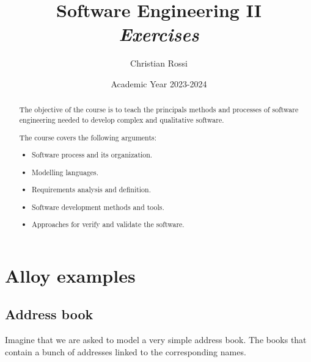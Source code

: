 \documentclass[12pt, a4paper]{report}
\title{Software Engineering II\\ \textit{Exercises}}
\author{Christian Rossi}
\date{Academic Year 2023-2024}
\newtheorem[style=M,bodystyle=\normalfont]{theorem}{Theorem}
\newtheorem[style=M,bodystyle=\normalfont]{corollary}{Corollary}
\newtheorem[style=M,bodystyle=\normalfont]{lemma}{Lemma}
\newtheorem[style=M,bodystyle=\normalfont]{definition}{Definition}
\begin{document}
\maketitle

\newpage

\begin{abstract}
    The objective of the course is to teach the principals methods and processes of software engineering needed to develop complex and qualitative software.
     
    The course covers the following arguments:
    \begin{itemize}
        \item Software process and its organization.
        \item Modelling languages.
        \item Requirements analysis and definition.
        \item Software development methods and tools.
        \item Approaches for verify and validate the software.
    \end{itemize}
\end{abstract}

\newpage

\tableofcontents

\newpage

\chapter{Alloy examples}
    \section{Address book}
    Imagine that we are asked to model a very simple address book. The books that contain a bunch of addresses linked to the corresponding names. 
    
\end{document}

